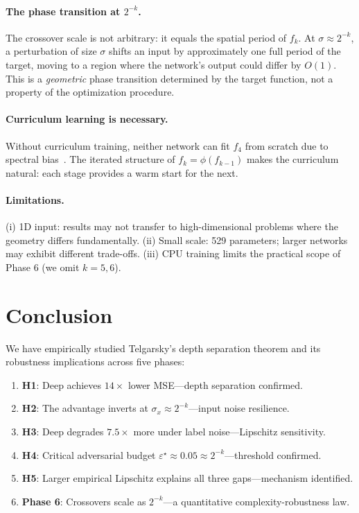 \documentclass[10pt,twocolumn]{article}
\newcommand{\sigx}{\sigma_x}
\newcommand{\epst}{\varepsilon^\star}
\begin{document}
\paragraph{The phase transition at $2^{-k}$.}
The crossover scale is not arbitrary: it equals the spatial period of $f_k$. At
$\sigma \approx 2^{-k}$, a perturbation of size $\sigma$ shifts an input by approximately
one full period of the target, moving to a region where the network's output could differ
by $O(1)$. This is a \emph{geometric} phase transition determined by the target function,
not a property of the optimization procedure.

\paragraph{Curriculum learning is necessary.}
Without curriculum training, neither network can fit $f_4$ from scratch due to spectral
bias~\citep{rahaman2019spectral}. The iterated structure of $f_k = \phi(f_{k-1})$ makes
the curriculum natural: each stage provides a warm start for the next.

\paragraph{Limitations.}
(i) 1D input: results may not transfer to high-dimensional problems where the geometry
differs fundamentally. (ii) Small scale: 529 parameters; larger networks may exhibit
different trade-offs. (iii) CPU training limits the practical scope of Phase 6 (we omit $k=5,6$).

\section{Conclusion}
\label{sec:conclusion}

We have empirically studied Telgarsky's depth separation theorem and its robustness
implications across five phases:

\begin{enumerate}
  \item \textbf{H1}: Deep achieves $14\times$ lower MSE—depth separation confirmed.
  \item \textbf{H2}: The advantage inverts at $\sigx \approx 2^{-k}$—input noise resilience.
  \item \textbf{H3}: Deep degrades $7.5\times$ more under label noise—Lipschitz sensitivity.
  \item \textbf{H4}: Critical adversarial budget $\epst \approx 0.05 \approx 2^{-k}$—threshold confirmed.
  \item \textbf{H5}: Larger empirical Lipschitz explains all three gaps—mechanism identified.
  \item \textbf{Phase 6}: Crossovers scale as $2^{-k}$—a quantitative complexity-robustness law.
\end{enumerate}
\end{document}
